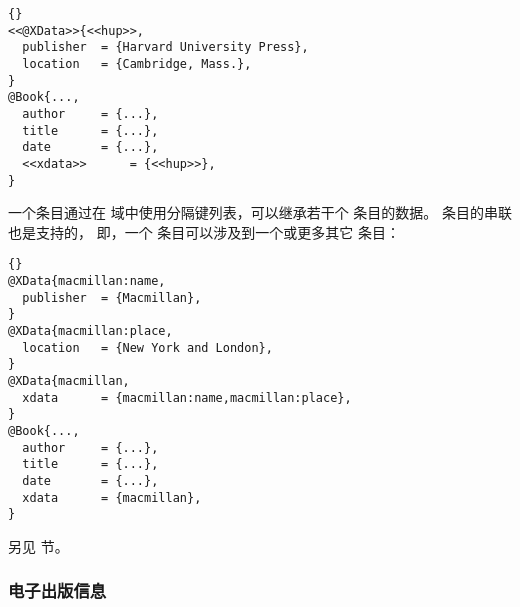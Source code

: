 \begin{lstlisting}[style=bibtex]{}
<<@XData>>{<<hup>>,
  publisher  = {Harvard University Press},
  location   = {Cambridge, Mass.},
}
@Book{...,
  author     = {...},
  title	     = {...},
  date	     = {...},
  <<xdata>>      = {<<hup>>},
}
\end{lstlisting}
%
一个条目通过在  域中使用分隔键列表，可以继承若干个  条目的数据。
 条目的串联也是支持的，
即，一个  条目可以涉及到一个或更多其它  条目：

\begin{lstlisting}[style=bibtex]{}
@XData{macmillan:name,
  publisher  = {Macmillan},
}
@XData{macmillan:place,
  location   = {New York and London},
}
@XData{macmillan,
  xdata      = {macmillan:name,macmillan:place},
}
@Book{...,
  author     = {...},
  title	     = {...},
  date	     = {...},
  xdata	     = {macmillan},
}
\end{lstlisting}
%
另见  节。

\subsubsection{电子出版信息}%
\label{use:use:epr}


